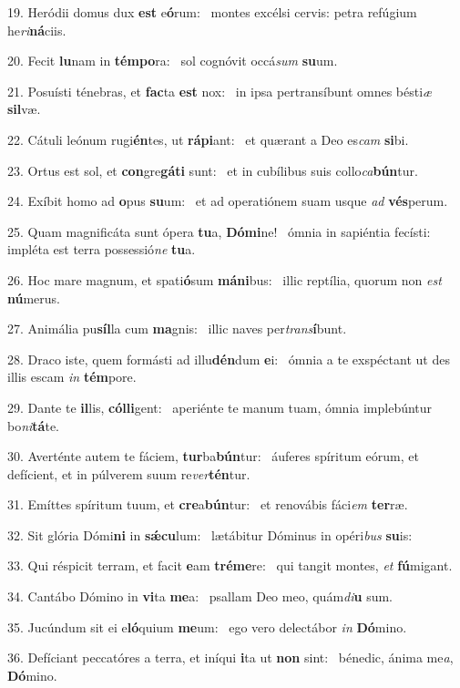 19. Heródii domus dux \textbf{est} e\textbf{ó}rum: \ast\  montes excélsi cervis: petra refúgium he\textit{ri}\textbf{ná}ciis.\

20. Fecit \textbf{lu}nam in \textbf{tém}\textbf{po}ra: \ast\  sol cognóvit occá\textit{sum} \textbf{su}um.\

21. Posuísti ténebras, et \textbf{fac}ta \textbf{est} nox: \ast\  in ipsa pertransíbunt omnes bésti\textit{æ} \textbf{sil}væ.\

22. Cátuli leónum rugi\textbf{én}tes, ut \textbf{rá}\textbf{pi}ant: \ast\  et quærant a Deo es\textit{cam} \textbf{si}bi.\

23. Ortus est sol, et \textbf{con}gre\textbf{gá}\textbf{ti} sunt: \ast\  et in cubílibus suis collo\textit{ca}\textbf{bún}tur.\

24. Exíbit homo ad \textbf{o}pus \textbf{su}um: \ast\  et ad operatiónem suam usque \textit{ad} \textbf{vés}perum.\

25. Quam magnificáta sunt ópera \textbf{tu}a, \textbf{Dó}\textbf{mi}ne! \ast\  ómnia in sapiéntia fecísti: impléta est terra possessió\textit{ne} \textbf{tu}a.\

26. Hoc mare magnum, et spati\textbf{ó}sum \textbf{má}\textbf{ni}bus: \ast\  illic reptília, quorum non \textit{est} \textbf{nú}merus.\

27. Animália pu\textbf{síl}la cum \textbf{ma}gnis: \ast\  illic naves per\textit{trans}\textbf{í}bunt.\

28. Draco iste, quem formásti ad illu\textbf{dén}dum \textbf{e}i: \ast\  ómnia a te exspéctant ut des illis escam \textit{in} \textbf{tém}pore.\

29. Dante te \textbf{il}lis, \textbf{cól}\textbf{li}gent: \ast\  aperiénte te manum tuam, ómnia implebúntur bo\textit{ni}\textbf{tá}te.\

30. Averténte autem te fáciem, \textbf{tur}ba\textbf{bún}tur: \ast\  áuferes spíritum eórum, et defícient, et in púlverem suum re\textit{ver}\textbf{tén}tur.\

31. Emíttes spíritum tuum, et \textbf{cre}a\textbf{bún}tur: \ast\  et renovábis fáci\textit{em} \textbf{ter}ræ.\

32. Sit glória Dómi\textbf{ni} in \textbf{sǽ}\textbf{cu}lum: \ast\  lætábitur Dóminus in opéri\textit{bus} \textbf{su}is:\

33. Qui réspicit terram, et facit \textbf{e}am \textbf{tré}\textbf{me}re: \ast\  qui tangit montes, \textit{et} \textbf{fú}migant.\

34. Cantábo Dómino in \textbf{vi}ta \textbf{me}a: \ast\  psallam Deo meo, quám\textit{di}\textbf{u} sum.\

35. Jucúndum sit ei e\textbf{ló}quium \textbf{me}um: \ast\  ego vero delectábor \textit{in} \textbf{Dó}mino.\

36. Defíciant peccatóres a terra, et iníqui \textbf{i}ta ut \textbf{non} sint: \ast\  bénedic, ánima me\textit{a}, \textbf{Dó}mino.\

